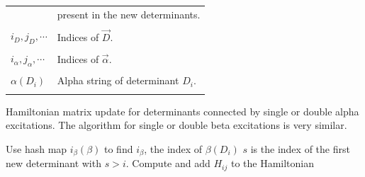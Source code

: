 \documentclass[%
reprint,
 superscriptaddress,
 amsmath,amssymb,
 aps,
]{revtex4-1}
\def\vecD{\vec{D}}
\def\veca{\vec{\alpha}}
\def\vecb{\vec{\beta}}
\def\ia{i_\alpha}
\def\ib{i_\beta}
\def\veciDb{\vec{i}_{D\beta}}
\begin{document}
\begin{table}[h]
\begin{tabular}{ll}
& present in the new determinants.\\
&\\
$i_D, j_D, \cdots$ & Indices of $\vecD$.\\
&\\
$\ia, j_\alpha, \cdots$ & Indices of $\veca$.\\
&\\
$\alpha(D_i)$ & Alpha string of determinant $D_i$.\\
&\\
\hline
\end{tabular}
\label{auxiliary}
\end{table}


\begin{algorithm}
\caption{Hamiltonian matrix update for determinants connected by single or double alpha excitations.
The algorithm for single or double beta excitations is very similar.
}
\begin{algorithmic}
\FOR{$D_i$ in $\vecD$}
  \State Use hash map $\ib(\beta)$ to find $\ib$, the index of $\beta(D_i)$
  \State $s$ is the index of the first new determinant with $s > i$.
  \FOR{$j$ in $\veciDb(\ib)$}
    \State Compute and add $H_{ij}$ to the Hamiltonian
  \ENDIF
  \ENDFOR
\ENDFOR
\end{algorithmic}
\label{same_spin}
\vskip 7mm
\end{algorithm}
\end{document}
